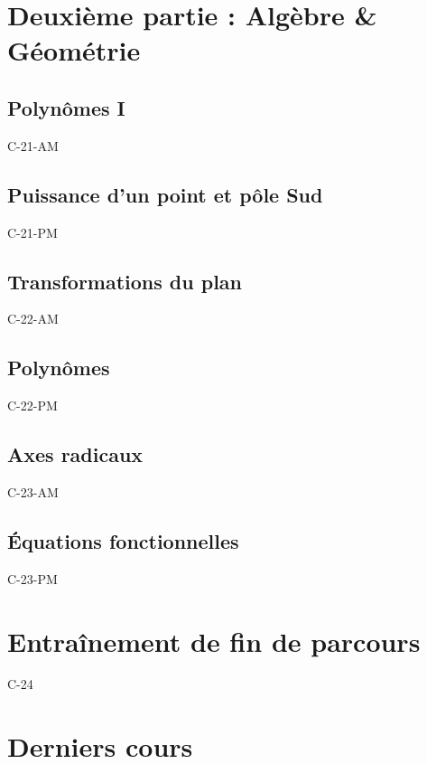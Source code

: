 \documentclass[poly,trombi]{valbonne}
\begin{document}
\section{Deuxième partie : Algèbre \& Géométrie}

\subsection{Polynômes I}

{C-21-AM}

\subsection{Puissance d'un point et pôle Sud}

{C-21-PM}

\subsection{Transformations du plan}

{C-22-AM}

\subsection{Polynômes}

{C-22-PM}

\subsection{Axes radicaux}

{C-23-AM}

\subsection{Équations fonctionnelles}

{C-23-PM}


\section{Entraînement de fin de parcours}

{C-24}


\section{Derniers cours}
\end{document}
